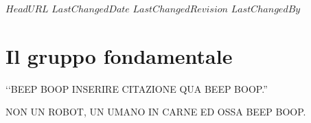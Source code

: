 \svnidlong
{$HeadURL$}
{$LastChangedDate$}
{$LastChangedRevision$}
{$LastChangedBy$}

\chapter{Il gruppo fondamentale}

\begin{introduction}
	‘‘BEEP BOOP INSERIRE CITAZIONE QUA BEEP BOOP.''
	\begin{flushright}
		\textsc{NON UN ROBOT,} UN UMANO IN CARNE ED OSSA BEEP BOOP.
	\end{flushright}
\end{introduction}
